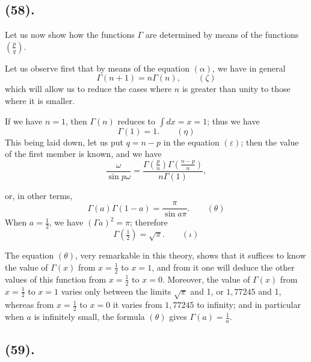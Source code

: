 \documentclass{article}
\begin{document}
\subsection*{(58).}

Let us now show how the functions $\Gamma$ are determined by means of the functions $\left(\frac{p}{q}\right)$.

Let us observe first that by means of the equation $(\alpha)$, we have in general
\[ \Gamma(n+1)=n\Gamma(n),\qquad(\zeta) \]
which will allow us to reduce the cases where $n$ is greater than unity to those where it is smaller.

If we have $n=1$, then $\Gamma(n)$ reduces to $\displaystyle\int dx=x=1$; thus we have
\[ \Gamma(1)=1.\qquad(\eta) \]
This being laid down, let us put $q=n-p$ in the equation $(\varepsilon)$; then the value of the first member is known, and we have
\[ \frac{\omega}{\sin p\omega}=\frac{\Gamma\left(\frac{p}{n}\right)\Gamma\left(\frac{n-p}{n}\right)}{n\Gamma(1)}, \]

or, in other terms,
\[ \Gamma(a)\Gamma(1-a)=\frac{\pi}{\sin a\pi}.\qquad(\theta) \]
When $a=\frac{1}{2}$, we have $(\Gamma a)^{2}=\pi$; therefore
\[ \Gamma\left(\tfrac{1}{2}\right)=\sqrt{\pi}.\qquad(\iota) \]

The equation $(\theta)$, very remarkable in this theory, shows that it suffices to know the value of $\Gamma(x)$ from $x=\frac{1}{2}$ to $x=1$, and from it one will deduce the other values of this function from $x=\frac{1}{2}$ to $x=0$. Moreover, the value of $\Gamma(x)$ from $x=\frac{1}{2}$ to $x=1$ varies only between the limits $\sqrt{\pi}$ and 1, or $1{,}77245$ and 1, whereas from $x=\frac{1}{2}$ to $x=0$ it varies from $1{,}77245$ to infinity; and in particular when $a$ is infinitely small, the formula $(\theta)$ gives $\Gamma(a)=\frac{1}{a}$.

\subsection*{(59).}
\end{document}
